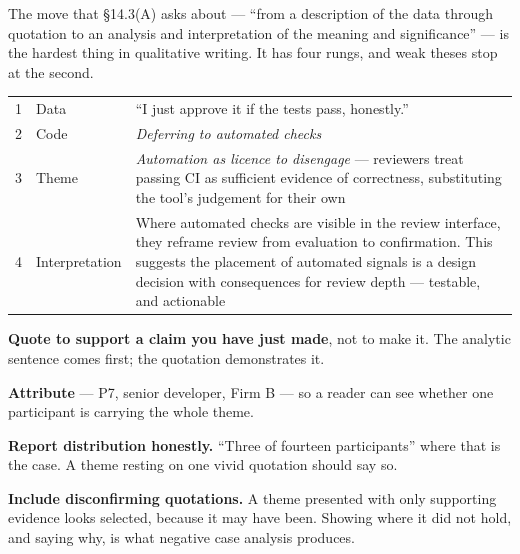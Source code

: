 The move that \S14.3(A) asks about --- ``from a description of the data through
quotation to an analysis and interpretation of the meaning and significance''
--- is the hardest thing in qualitative writing. It has four rungs, and weak
theses stop at the second.

\begin{center}
\small
\begin{tabular}{@{}L{1.0cm}L{3.4cm}L{9.9cm}@{}}
 & Data          & ``I just approve it if the tests pass, honestly.'' \\
2 & Code          & \emph{Deferring to automated checks} \\
3 & Theme         & \emph{Automation as licence to disengage} --- reviewers
                    treat passing CI as sufficient evidence of correctness,
                    substituting the tool's judgement for their own \\
4 & Interpretation & Where automated checks are visible in the review
                    interface, they reframe review from evaluation to
                    confirmation. This suggests the placement of automated
                    signals is a design decision with consequences for review
                    depth --- testable, and actionable \\
\bottomrule
\end{tabular}
\end{center}

\begin{conceptbox}
\begin{tight}
  \item \textbf{Quote to support a claim you have just made}, not to make it.
    The analytic sentence comes first; the quotation demonstrates it.
  \item \textbf{Attribute} --- P7, senior developer, Firm B --- so a reader can
    see whether one participant is carrying the whole theme.
  \item \textbf{Report distribution honestly.} ``Three of fourteen
    participants'' where that is the case. A theme resting on one vivid
    quotation should say so.
  \item \textbf{Include disconfirming quotations.} A theme presented with only
    supporting evidence looks selected, because it may have been. Showing where
    it did not hold, and saying why, is what negative case analysis produces.
\end{tight}
\end{conceptbox}


